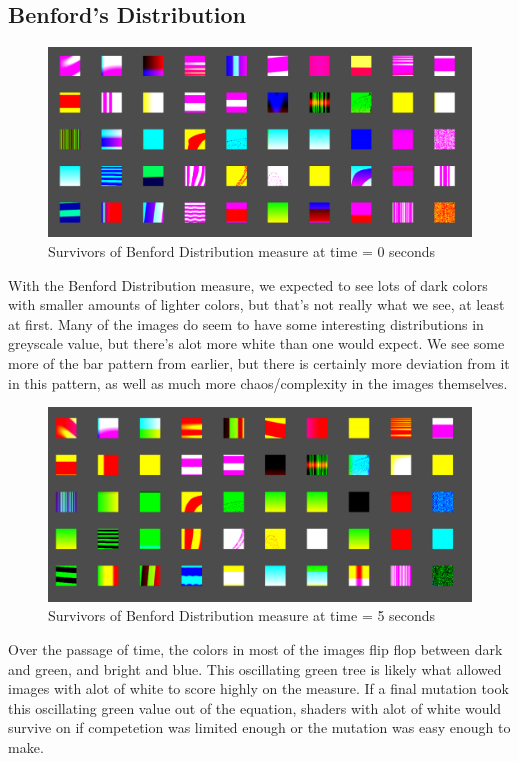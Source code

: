 \documentclass{acmart}
\begin{document}
\subsection*{Benford's Distribution}
\begin{figure}[h!]
    \caption{Survivors of Benford Distribution measure at time = 0 seconds}
    \includegraphics[width =\textwidth]{Benford_0.PNG}
\end{figure}
With the Benford Distribution measure, we expected to see lots of dark colors with smaller amounts of lighter colors, but that's not really what we see, at least at first. Many of the images
do seem to have some interesting distributions in greyscale value, but there's alot more white than one would expect. We see some more of the bar pattern from earlier, but there is certainly more deviation from it in this pattern,
as well as much more chaos/complexity in the images themselves.
\newpage
\begin{figure}[h!]
    \caption{Survivors of Benford Distribution measure at time = 5 seconds}
    \includegraphics[width =\textwidth]{Benford_5.PNG}
\end{figure}
Over the passage of time, the colors in most of the images flip flop between dark and green, and bright and blue. This oscillating green tree is likely what allowed images with
alot of white to score highly on the measure. If a final mutation took this oscillating green value out of the equation, shaders with alot of white would survive on if competetion was limited enough or the 
mutation was easy enough to make.
\end{document}
